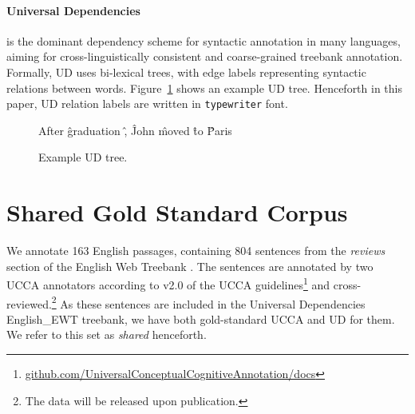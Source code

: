 \documentclass[11pt,a4paper]{article}
\begin{document}
\paragraph{Universal Dependencies}\label{sec:ud}
\cite[UD; ][]{nivre2016universal} is
the dominant dependency scheme for
syntactic  annotation in many languages,
aiming for cross-linguistically consistent and coarse-grained treebank
annotation. Formally, UD uses bi-lexical trees, with edge labels 
representing syntactic relations between words.
Figure~\ref{fig:original_example_ud} shows an example UD tree.
Henceforth in this paper, UD relation labels are written in \texttt{typewriter} font.

\begin{figure}[th]
  \centering
    \begin{dependency}[text only label, label style={above,font=\tt}, font=\small]
    \begin{deptext}[column sep=.8em,ampersand replacement=\^]
    After \^ graduation \^ , \^ John \^ moved \^ to \^ Paris \\
    \end{deptext}
    \end{dependency}
\caption{Example UD tree.\label{fig:original_example_ud}}
\end{figure}


\section{Shared Gold Standard Corpus}\label{sec:shared}

We annotate 163 English passages, containing 804 sentences
from the \textit{reviews} section of the 
English Web Treebank \cite[EWT; ][]{bies2012english}.
The sentences are annotated by two UCCA annotators
according to v2.0 of the UCCA
guidelines\footnote{\tiny\url{github.com/UniversalConceptualCognitiveAnnotation/docs}}
and cross-reviewed.\footnote{The data will be released upon publication.}
As these sentences are included in the Universal Dependencies 
English\_EWT treebank, we have both gold-standard UCCA and UD for them. 
We refer to this set as \textit{shared} henceforth.
\end{document}
